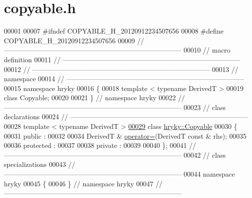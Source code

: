\hypertarget{copyable_8h_source}{\section{copyable.\-h}
}

\begin{DoxyCode}
00001 
00007 \textcolor{preprocessor}{#ifndef COPYABLE\_H\_20120912234507656}
00008 \textcolor{preprocessor}{}\textcolor{preprocessor}{#define COPYABLE\_H\_20120912234507656}
00009 \textcolor{preprocessor}{}\textcolor{comment}{//
      ------------------------------------------------------------------------------}
00010 \textcolor{comment}{// macro definition}
00011 \textcolor{comment}{//
      ------------------------------------------------------------------------------}
00012 \textcolor{comment}{//
      ------------------------------------------------------------------------------}
00013 \textcolor{comment}{// namespace}
00014 \textcolor{comment}{//
      ------------------------------------------------------------------------------}
00015 \textcolor{keyword}{namespace }hryky
00016 \{
00018     \textcolor{keyword}{template} < \textcolor{keyword}{typename} DerivedT >
00019     \textcolor{keyword}{class }Copyable;
00020 
00021 \} \textcolor{comment}{// namespace hryky}
00022 \textcolor{comment}{//
      ------------------------------------------------------------------------------}
00023 \textcolor{comment}{// class declarations}
00024 \textcolor{comment}{//
      ------------------------------------------------------------------------------}
00028 \textcolor{comment}{}\textcolor{keyword}{template} < \textcolor{keyword}{typename} DerivedT >
\hypertarget{copyable_8h_source_l00029}{}\hyperlink{classhryky_1_1_copyable}{00029} \textcolor{keyword}{class }\hyperlink{classhryky_1_1_copyable}{hryky::Copyable}
00030 \{
00031 \textcolor{keyword}{public} :
00032 
00034     DerivedT & \hyperlink{classhryky_1_1_copyable_a8ba34166fbf522863d3318e820d18212}{operator=}(DerivedT \textcolor{keyword}{const} & rhs);
00035 
00036 \textcolor{keyword}{protected} :
00037 
00038 \textcolor{keyword}{private} :
00039 
00040 \};
00041 \textcolor{comment}{//
      ------------------------------------------------------------------------------}
00042 \textcolor{comment}{// class specializations}
00043 \textcolor{comment}{//
      ------------------------------------------------------------------------------}
00044 \textcolor{keyword}{namespace }hryky
00045 \{
00046 \} \textcolor{comment}{// namespace hryky}
00047 \textcolor{comment}{//
      ------------------------------------------------------------------------------}

\end{DoxyCode}
